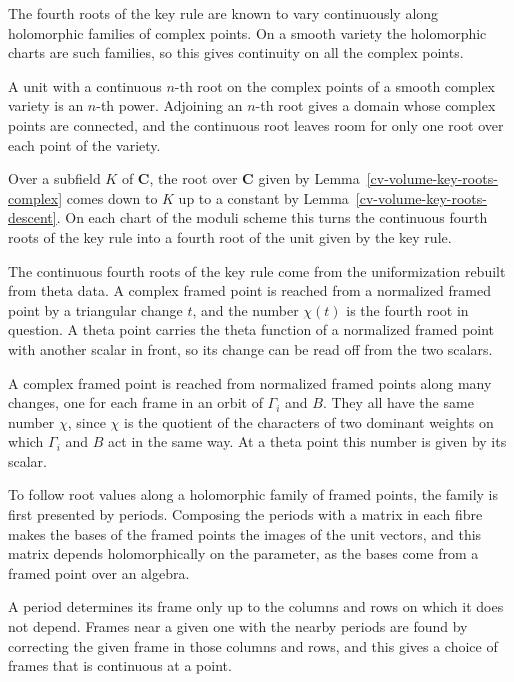 The fourth roots of the key rule are known to vary continuously along holomorphic families of complex points.
On a smooth variety the holomorphic charts are such families, so this gives continuity on all the complex
points.

A unit with a continuous $n$-th root on the complex points of a smooth complex variety is an $n$-th power.
Adjoining an $n$-th root gives a domain whose complex points are connected, and the continuous root leaves
room for only one root over each point of the variety.

Over a subfield $K$ of $\mathbf C$, the root over $\mathbf C$ given by Lemma~\ref{cv-volume-key-roots-complex}
comes down to $K$ up to a constant by Lemma~\ref{cv-volume-key-roots-descent}. On each chart of the moduli
scheme this turns the continuous fourth roots of the key rule into a fourth root of the unit given by the key
rule.

The continuous fourth roots of the key rule come from the uniformization rebuilt from theta data. A complex
framed point is reached from a normalized framed point by a triangular change $t$, and the number $\chi(t)$ is
the fourth root in question. A theta point carries the theta function of a normalized framed point with another
scalar in front, so its change can be read off from the two scalars.

A complex framed point is reached from normalized framed points along many changes, one for each frame in an
orbit of $\Gamma_i$ and $B$. They all have the same number $\chi$, since $\chi$ is the quotient of the characters
of two dominant weights on which $\Gamma_i$ and $B$ act in the same way. At a theta point this number is given
by its scalar.

To follow root values along a holomorphic family of framed points, the family is first presented by periods.
Composing the periods with a matrix in each fibre makes the bases of the framed points the images of the unit
vectors, and this matrix depends holomorphically on the parameter, as the bases come from a framed point over an
algebra.

A period determines its frame only up to the columns and rows on which it does not depend. Frames near a given
one with the nearby periods are found by correcting the given frame in those columns and rows, and this gives a
choice of frames that is continuous at a point.

